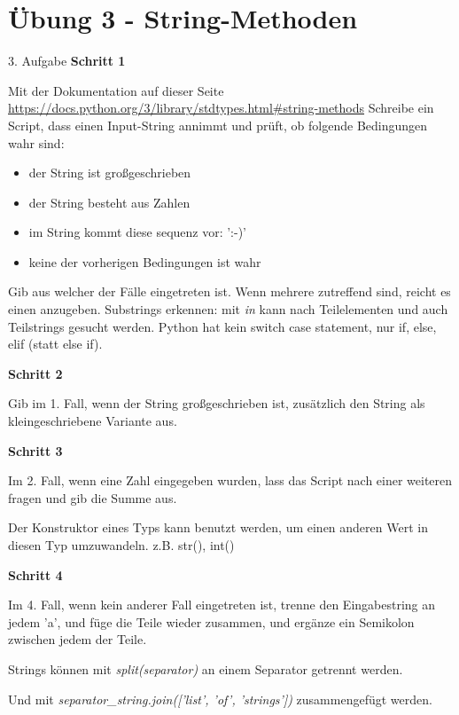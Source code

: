 \section{Übung 3 - String-Methoden}

\begin{frame}{3. Aufgabe}
	\textbf{Schritt 1}
	
	Mit der Dokumentation auf dieser Seite
	\href{https://docs.python.org/3/library/stdtypes.html\#string-methods}{https://docs.python.org/3/library/stdtypes.html\#string-methods}
	Schreibe ein Script, dass einen Input-String annimmt und prüft, ob folgende Bedingungen wahr sind:
	
	\begin{itemize}
		\item[(1.)] der String ist großgeschrieben
		\item[(2.)] der String besteht aus Zahlen
		\item[(3.)] im String kommt diese sequenz vor: ':-)'
		\item[(4.)] keine der vorherigen Bedingungen ist wahr
	\end{itemize}
	
	Gib aus welcher der Fälle eingetreten ist. Wenn mehrere zutreffend sind, reicht es einen anzugeben. \linebreak
	Substrings erkennen: mit \textit{in} kann nach Teilelementen und auch Teilstrings gesucht werden. \linebreak
	Python hat kein switch case statement, nur if, else, elif (statt else if).
\end{frame}
\begin{frame}
	\textbf{Schritt 2}
	
	Gib im 1. Fall, wenn der String großgeschrieben ist, zusätzlich den String als kleingeschriebene Variante aus.
	\linebreak
	
	\textbf{Schritt 3}
	
	Im 2. Fall, wenn eine Zahl eingegeben wurden, lass das Script nach einer weiteren fragen und gib die Summe aus.

	Der Konstruktor eines Typs kann benutzt werden, um einen anderen Wert in diesen Typ umzuwandeln. z.B. str(), int()
	
\end{frame}
\begin{frame}
	\textbf{Schritt 4}
	
	Im 4. Fall, wenn kein anderer Fall eingetreten ist, trenne den Eingabestring an jedem 'a', und füge die Teile wieder zusammen, und ergänze ein Semikolon zwischen jedem der Teile.

	Strings können mit \textit{split(separator)} an einem Separator getrennt werden.
	
	Und mit \textit{separator\_string.join(['list', 'of', 'strings'])} zusammengefügt werden.
\end{frame}


